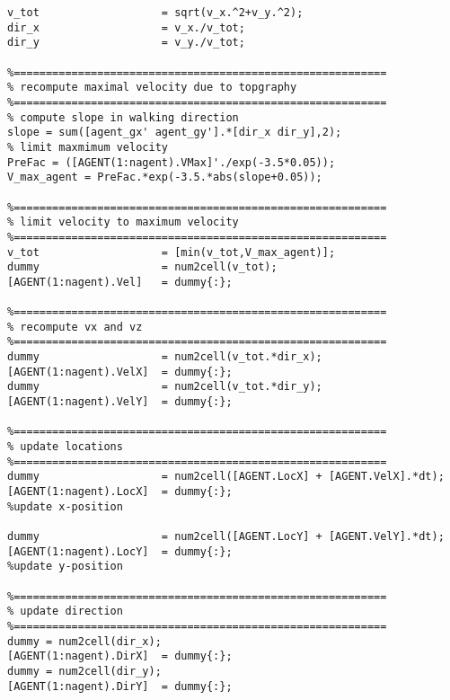 \begin{lstlisting}[breaklines]
% compute total velocity and direction of agent
v_tot                   = sqrt(v_x.^2+v_y.^2);
dir_x                   = v_x./v_tot;
dir_y                   = v_y./v_tot;

%==========================================================
% recompute maximal velocity due to topgraphy
%==========================================================
% compute slope in walking direction
slope = sum([agent_gx' agent_gy'].*[dir_x dir_y],2);
% limit maxmimum velocity
PreFac = ([AGENT(1:nagent).VMax]'./exp(-3.5*0.05));
V_max_agent = PreFac.*exp(-3.5.*abs(slope+0.05));

%==========================================================
% limit velocity to maximum velocity
%==========================================================
v_tot                   = [min(v_tot,V_max_agent)];
dummy                   = num2cell(v_tot);
[AGENT(1:nagent).Vel]   = dummy{:};

%==========================================================
% recompute vx and vz
%==========================================================
dummy                   = num2cell(v_tot.*dir_x);
[AGENT(1:nagent).VelX]  = dummy{:};
dummy                   = num2cell(v_tot.*dir_y);
[AGENT(1:nagent).VelY]  = dummy{:};

%==========================================================
% update locations
%==========================================================
dummy                   = num2cell([AGENT.LocX] + [AGENT.VelX].*dt);
[AGENT(1:nagent).LocX]  = dummy{:};                                                     %update x-position

dummy                   = num2cell([AGENT.LocY] + [AGENT.VelY].*dt);
[AGENT(1:nagent).LocY]  = dummy{:};                                                     %update y-position

%==========================================================
% update direction
%==========================================================
dummy = num2cell(dir_x);
[AGENT(1:nagent).DirX]  = dummy{:};
dummy = num2cell(dir_y);
[AGENT(1:nagent).DirY]  = dummy{:};
\end{lstlisting}